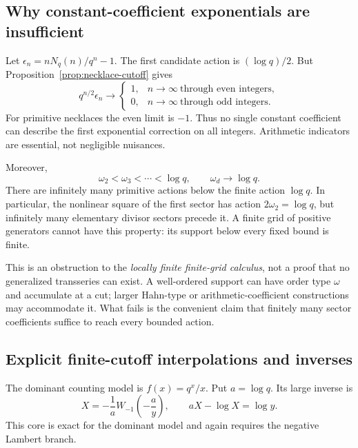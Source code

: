 \documentclass[11pt,a4paper]{article}
\numberwithin{equation}{section}
\theoremstyle{definition}
\theoremstyle{remark}
\begin{document}
\subsection{Why constant-coefficient exponentials are insufficient}

Let $\epsilon_n=nN_q(n)/q^n-1$. The first candidate action is $(\log q)/2$. But Proposition~\ref{prop:necklace-cutoff} gives
\begin{equation}
 q^{n/2}\epsilon_n\longrightarrow
 \begin{cases}1,&n\to\infty\ \text{through even integers},\\
               0,&n\to\infty\ \text{through odd integers}.
 \end{cases}
 \label{eq:necklace-parity-obstruction}
\end{equation}
For primitive necklaces the even limit is $-1$. Thus no single constant coefficient can describe the first exponential correction on all integers. Arithmetic indicators are essential, not negligible nuisances.

Moreover,
\begin{equation}
 \omega_2<\omega_3<\cdots<\log q,
 \qquad \omega_d\longrightarrow\log q.
 \label{eq:necklace-action-accumulation}
\end{equation}
There are infinitely many primitive actions below the finite action $\log q$. In particular, the nonlinear square of the first sector has action $2\omega_2=\log q$, but infinitely many elementary divisor sectors precede it. A finite grid of positive generators cannot have this property: its support below every fixed bound is finite.

This is an obstruction to the \emph{locally finite finite-grid calculus}, not a proof that no generalized transseries can exist. A well-ordered support can have order type $\omega$ and accumulate at a cut; larger Hahn-type or arithmetic-coefficient constructions may accommodate it. What fails is the convenient claim that finitely many sector coefficients suffice to reach every bounded action.

\subsection{Explicit finite-cutoff interpolations and inverses}

The dominant counting model is $f(x)=q^x/x$. Put $a=\log q$. Its large inverse is
\begin{equation}
 X=-\frac1a W_{-1}\!\left(-\frac ay\right),
 \qquad aX-\log X=\log y.
 \label{eq:necklace-core}
\end{equation}
This core is exact for the dominant model and again requires the negative Lambert branch.
\end{document}
